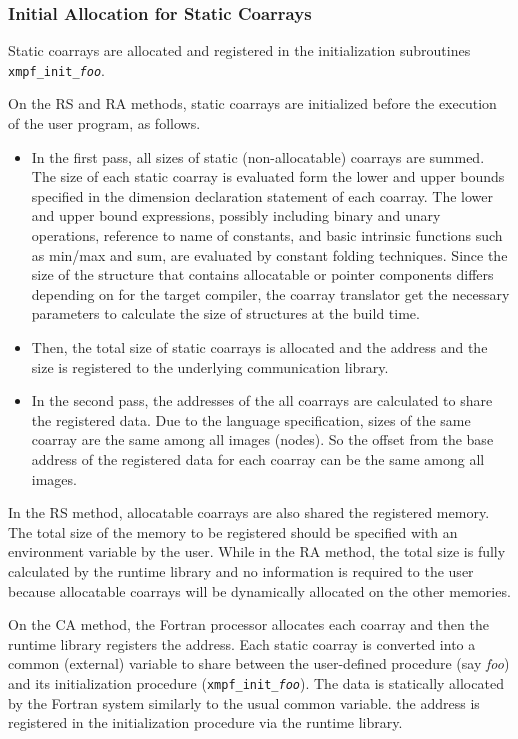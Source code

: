 %
%


\subsubsection{Initial Allocation for Static Coarrays}

Static coarrays are allocated and registered in the initialization subroutines 
{\tt xmpf\_init\_{\it foo}}. 

On the RS and RA methods,
static coarrays are initialized before the execution of the user program,
as follows.
\begin{itemize}
\item
In the first pass, all sizes of static (non-allocatable) coarrays are summed.
The size of each static coarray is evaluated form the lower and upper bounds
specified in the dimension declaration statement of each coarray.
The lower and upper bound expressions, possibly including binary and unary
operations, reference to name of constants, and basic intrinsic functions 
such as min/max and sum, are evaluated by constant folding techniques.
Since the size of the structure that contains allocatable or pointer 
components differs depending on for the target compiler, the coarray translator
get the necessary parameters to calculate the size of structures at the build time.
\item
Then, the total size of static coarrays is allocated and the address
and the size is registered to the underlying communication library.
\item
In the second pass, the addresses of the all coarrays are calculated to share
the registered data.
Due to the language specification, sizes of the same coarray are the same 
among all images (nodes). So the offset from the base address of the registered 
data for each coarray can be the same among all images.
\end{itemize}
%
In the RS method, allocatable coarrays are also shared the registered memory. 
The total size of the memory to be registered
should be specified with an environment variable by the user.
While in the RA method, the total size is fully calculated by the runtime 
library and no information is required to the user because allocatable coarrays
will be dynamically allocated on the other memories.

On the CA method,
the Fortran processor allocates each coarray and then the runtime library
registers the address.
Each static coarray is converted into a common (external) variable to share 
between the user-defined procedure (say {\it foo}) and its initialization
procedure ({\tt xmpf\_init\_{\it foo}}). The data is statically allocated
by the Fortran system similarly to the usual common variable.
the address is registered in the initialization procedure via the runtime
library.


